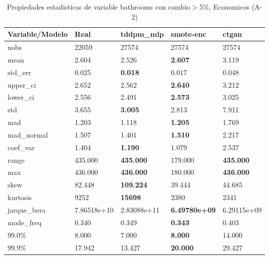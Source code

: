 \begin{table}[H]
\centering
\fontsize{8}{14}\selectfont
\caption{Propiedades estadisticas de variable bathrooms con cambio\ensuremath{>}5\%, Economicos (A-2)}
\label{table-stats-economicos-a-2-bathrooms-short}
\begin{tabular}{|l|m{10em}|m{10em}|m{10em}|m{10em}|}
\hline
 \rowcolor[gray]{0.8}
Variable/Modelo & Real & tddpm\_mlp & smote-enc & ctgan \\
\hline nobs & 22059 & 27574 & 27574 & 27574 \\
\hline mean & 2.604 & 2.526 & \bfseries 2.607 & \cellcolor[rgb]{0.9, 0.54, 0.52} 3.119 \\
\hline std\_err & 0.025 & \bfseries 0.018 & 0.017 & \cellcolor[rgb]{0.9, 0.54, 0.52} 0.048 \\
\hline upper\_ci & 2.652 & 2.562 & \bfseries 2.640 & \cellcolor[rgb]{0.9, 0.54, 0.52} 3.212 \\
\hline lower\_ci & 2.556 & 2.491 & \bfseries 2.573 & \cellcolor[rgb]{0.9, 0.54, 0.52} 3.025 \\
\hline std & 3.655 & \bfseries 3.005 & 2.813 & \cellcolor[rgb]{0.9, 0.54, 0.52} 7.911 \\
\hline mad & 1.203 & 1.118 & \bfseries 1.205 & \cellcolor[rgb]{0.9, 0.54, 0.52} 1.769 \\
\hline mad\_normal & 1.507 & 1.401 & \bfseries 1.510 & \cellcolor[rgb]{0.9, 0.54, 0.52} 2.217 \\
\hline coef\_var & 1.404 & \bfseries 1.190 & 1.079 & \cellcolor[rgb]{0.9, 0.54, 0.52} 2.537 \\
\hline range & 435.000 & \bfseries 435.000 & \cellcolor[rgb]{0.9, 0.54, 0.52} 179.000 & \bfseries 435.000 \\
\hline max & 436.000 & \bfseries 436.000 & \cellcolor[rgb]{0.9, 0.54, 0.52} 180.000 & \bfseries 436.000 \\
\hline skew & 82.448 & \bfseries 109.224 & \cellcolor[rgb]{0.9, 0.54, 0.52} 39.444 & 44.685 \\
\hline kurtosis & 9252 & \bfseries 15698 & 2380 & \cellcolor[rgb]{0.9, 0.54, 0.52} 2341 \\
\hline jarque\_bera & 7.86518e+10 & \cellcolor[rgb]{0.9, 0.54, 0.52} 2.83088e+11 & \bfseries 6.49780e+09 & 6.29115e+09 \\
\hline mode\_freq & 0.340 & 0.349 & \bfseries 0.343 & \cellcolor[rgb]{0.9, 0.54, 0.52} 0.403 \\
\hline 99.0\% & 8.000 & 7.000 & \bfseries 8.000 & \cellcolor[rgb]{0.9, 0.54, 0.52} 14.000 \\
\hline 99.9\% & 17.942 & 13.427 & \bfseries 20.000 & \cellcolor[rgb]{0.9, 0.54, 0.52} 29.427 \\
\hline
\end{tabular}
\end{table}
